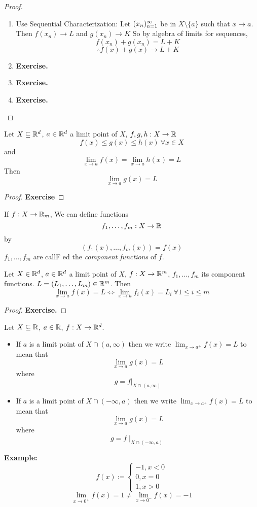 \documentclass[openany]{report}
\begin{document}
\begin{proof}
    \begin{enumerate}[label=(\roman*)]
        \item Use Sequential Characterization: Let $({x}_n)_{n=1}^\infty$ be in $X \setminus \{a\}$
        such that $x \rightarrow a$. Then $f(x_n) \rightarrow L$ and $g(x_n) \rightarrow K$
        So by algebra of limits for sequences, 
        $$f(x_n) + g(x_n) = L + K$$
        $$\therefore f(x) + g(x) \rightarrow L + K$$
        \item \textbf{Exercise.}
        \item \textbf{Exercise.}
        \item \textbf{Exercise.}
    \end{enumerate}
\end{proof}
\begin{theorem}
    Let $X \subseteq \mathbb{R}^d$, $a \in \mathbb{R}^d$ a limit point of $X$, 
    $f,g,h: X \rightarrow \mathbb{R}$
    $$f(x) \leq g(x) \leq h(x) \ \forall x \in X$$
    and 
    $$\lim_{x\rightarrow a} f(x) =  \lim_{x \rightarrow a} h(x) = L$$
    Then
    $$\lim_{x\rightarrow a} g(x) = L$$
\end{theorem}
\begin{proof}
    \textbf{Exercise}
\end{proof}
If $f: X \rightarrow \mathbb{R}_m$, We can define functions 
$$f_1, \ldots, f_m: X \rightarrow \mathbb{R}$$
by 
$$(f_1(x), \ldots, f_m(x)) = f(x)$$
$f_1, \ldots, f_m$ are callF    ed the \emph{component functions} of $f$.
\begin{prop}
    Let $X \in \mathbb{R}^d$, $a \in \mathbb{R}^d$ a limit point of $X$, $f: X \rightarrow \mathbb{R}^m$,
    $f_1,\ldots, f_m$ its component functions. $L = (L_1, \ldots, L_m) \in \mathbb{R}^m$. Then
    $$\lim_{x\rightarrow a} f(x) = L \iff \lim_{x\rightarrow a} f_i(x) = L_i \ \forall 1 \leq i \leq m$$
\end{prop}
\begin{proof}
    \textbf{Exercise.}
\end{proof}
\begin{definition}
    Let $X \subseteq \mathbb{R}$, $a \in \mathbb{R}$, $f: X \rightarrow \mathbb{R}^d$.
    \begin{itemize}
        \item If $a$ is a limit point of $X \cap (a, \infty)$ then we write
            $\lim_{x\rightarrow a^+} f(x) = L$ to mean that 
            $$\lim_{x \rightarrow a} g(x) = L$$
            where 
            $$g = f{\big|}_{X \cap (a, \infty)}$$
        \item If $a$ is a limit point of $X \cap (-\infty,a)$ then we write
        $\lim_{x\rightarrow a^+} f(x) = L$ to mean that 
        $$\lim_{x \rightarrow a} g(x) = L$$
        where 
        $$g = f \mid_{X \cap (-\infty, a)}$$
    \end{itemize}
\end{definition}
\textbf{Example:}
$$f(x)\coloneqq \begin{cases}
    -1, x < 0\\
    0, x = 0\\
    1, x > 0
\end{cases}$$
$$\lim_{x \rightarrow 0^+} f(x) = 1 \neq \lim_{x \rightarrow 0^-} f(x) = -1$$
\end{document}
